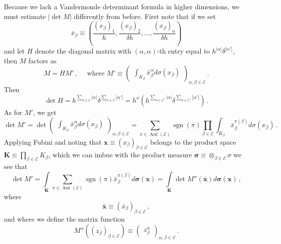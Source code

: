 \documentclass{amsart}%
\theoremstyle{plain}
\numberwithin{equation}{section}
\begin{document}
 Because we lack a Vandermonde determinant formula in higher dimensions, we must estimate $\left | \det M \right |$ differently from before. First note that if we set 
\[
	\bar{x}_{\beta} \equiv \left ( \frac{(x_{\beta})_1}{h}, \frac{ (x_{\beta})_2}{\delta h}, \ldots,  \frac{ (x_{\beta})_n}{\delta h} \right )
\]
and let $H$ denote the diagonal matrix with $(\alpha, \alpha)$-th entry equal to $h^{|\alpha|} \delta^{|\alpha'|}$, 
then 
$M$ factors as 
\[
	M = H M' \, , \quad \text{ where } M' \equiv \begin{pmatrix} \int_{K_{\beta}} \bar{x}^{\alpha} _{\beta} d \sigma (x_{\beta}) \end{pmatrix}_{\alpha, \beta \in \mathcal{E}} \, . 
\]
Then 
\[
	\det H = h ^{\sum\limits_{\alpha \in \mathcal{E}} |\alpha|} \delta ^{\sum\limits_{\alpha \in \mathcal{E}} |\alpha'|} =  h ^{\kappa} \left ( h^{\sum\limits_{\alpha \in \mathcal{E}^*} |\alpha|} \delta ^{\sum\limits_{\alpha \in \mathcal{E}^*} |\alpha'|} \right ) \, .
\]
As for $M'$, we get
\[
	\det M' =  \det \begin{pmatrix} \int_{K_{\beta}}  \bar{x}^{\alpha} _{\beta} d \sigma (x_{\beta}) \end{pmatrix}_{\alpha, \beta \in \mathcal{E}} = \sum\limits_{\pi \in \operatorname{Aut} \left (\mathcal{E} \right )} \operatorname{sgn} (\pi) \prod\limits_{\beta \in \mathcal{E}} \int_{K_{\beta}}  \bar{x}^{\pi(\beta)} _{\beta} d \sigma (x_{\beta}) \, .
\]
Applying Fubini and noting that $\mathbf{x} \equiv \left ( x_{\beta} \right )_{\beta \in \mathcal{E}}$ belongs to the product space $\mathbf{K} \equiv \prod\limits_{\beta \in \mathcal{E}} K_{\beta}$, which we can imbue with the product measure $\boldsymbol{\sigma} \equiv \otimes_{\beta \in \mathcal{E}} \sigma$ we see that 
\begin{equation}\label{eq:det_Fubini}
	\det M' = \int\limits_{\mathbf{K}} \sum\limits_{\pi \in \operatorname{Aut} \left (\mathcal{E} \right )} \operatorname{sgn} (\pi)   \bar{x}^{\pi(\beta)} _{\beta}  d  \boldsymbol{\sigma}  (\mathbf{x})  = \int\limits_{\mathbf{K} } \det M'' (\bar{\mathbf{x}})  d  \boldsymbol{\sigma}  (\mathbf{x}) \, ,
\end{equation}
where
\[
	\bar{\mathbf{x}} \equiv \left ( \bar{x}_{\beta} \right )_{\beta \in \mathcal{E}} \, ,
\]
and where we define the matrix function 
\[
	M'' \left (\left ( z_{\beta}\right )_{\beta \in \mathcal{E}} \right ) \equiv \begin{pmatrix} z_{\beta} ^{\alpha} \end{pmatrix}_{\alpha, \beta \in \mathcal{E}} \, .
\]
\end{document}
